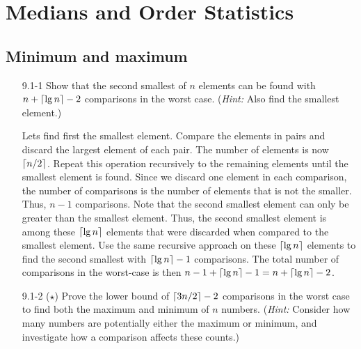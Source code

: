 \chapter{Medians and Order Statistics}

\section{Minimum and maximum}

\begin{enumerate}

\item[9.1{-}1]{Show that the second smallest of $n$ elements can be found with
$n + \lceil\lg n\rceil - 2$ comparisons in the worst case. (\emph{Hint:} Also find
the smallest element.)}

\begin{framed}
Lets find first the smallest element. Compare the elements in pairs and discard
the largest element of each pair. The number of elements is now $\lceil n/2\rceil$.
Repeat this operation recursively to the remaining elements until the smallest
element is found. Since we discard one element in each comparison, the number of
comparisons is the number of elements that is not the smaller.  Thus, $n - 1$
comparisons. Note that the second smallest element can only be greater than the
smallest element. Thus, the second smallest element is among these
$\lceil\lg n\rceil$ elements that were discarded when compared to the smallest
element. Use the same recursive approach on these $\lceil\lg n\rceil$ elements to
find the second smallest with $\lceil\lg n\rceil - 1$ comparisons. The total number
of comparisons in the worst-case is then $n - 1 + \lceil\lg n\rceil
- 1 = n + \lceil\lg n\rceil - 2$.
\end{framed}

\item[9.1{-}2]{($\star$) Prove the lower bound of $\lceil3n/2\rceil - 2$ comparisons
in the worst case to find both the maximum and minimum of $n$ numbers.
(\emph{Hint:} Consider how many numbers are potentially either the maximum or
minimum, and investigate how a comparison affects these counts.)}


\end{enumerate}
